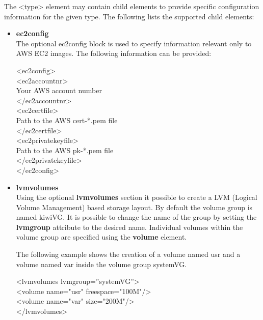 The <type> element may contain child elements to provide specific
configuration information for the given type. The following lists the 
supported child elements:

\begin{itemize}
\item \textbf{ec2config}\\
    The optional ec2config block is used to specify information relevant
    only to AWS EC2 images. The following information can be provided:

    \begin{Command}{14cm}
    <ec2config>\\
    \hspace*{1cm}<ec2accountnr>\\
    \hspace*{2cm}Your AWS account number\\
    \hspace*{1cm}</ec2accountnr>\\
    \hspace*{1cm}<ec2certfile>\\
    \hspace*{2cm}Path to the AWS cert-*.pem file\\
    \hspace*{1cm}</ec2certfile>\\
    \hspace*{1cm}<ec2privatekeyfile>\\
    \hspace*{2cm}Path to the AWS pk-*.pem file\\
    \hspace*{1cm}</ec2privatekeyfile>\\
    </ec2config>
    \end{Command}

\item \textbf{lvmvolumes}\\
	Using the optional \textbf{lvmvolumes} section it possible to create
    a LVM (Logical Volume Management) based storage layout. By default the
    volume group is named kiwiVG. It is possible to change the name of the
    group by setting the \textbf{lvmgroup} attribute to the desired name.
    Individual volumes within the volume group are specified using the 
    \textbf{volume} element. 

    The following example shows the creation of a volume named usr and a
    volume named var inside the volume group systemVG.

	\begin{Command}{12cm}
	<lvmvolumes lvmgroup=''systemVG''>\\
	\hspace*{1cm}<volume name="usr" freespace="100M"/>\\
	\hspace*{1cm}<volume name="var" size="200M"/>\\
	</lvmvolumes>
	\end{Command}


\end{itemize}
